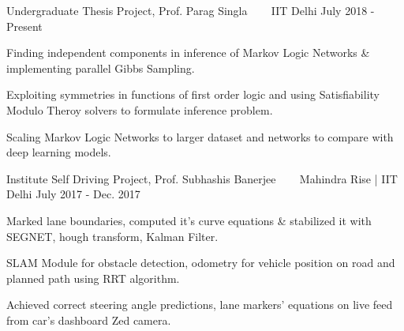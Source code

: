 


\begin{cventries}

  
  \cventry
  {Undergraduate Thesis Project, Prof. Parag Singla}
  {\href{https://github.com/saketdingliwal/MLN-Inference-Task}{}
    \ \ \ \normalfont\href{https://github.com/saketdingliwal/MLN-Inference-Task}
    {}}
  {IIT Delhi}
  {July 2018 - Present}
  {
    \begin{cvitems}
    \item Finding independent components in inference of Markov Logic Networks \& implementing parallel Gibbs Sampling.
    \item Exploiting symmetries in functions of first order logic and using Satisfiability Modulo Theroy solvers to formulate inference problem.
    \item Scaling Markov Logic Networks to larger dataset and networks to compare with deep learning models.
    \end{cvitems}
  }

  \cventry
  {Institute Self Driving Project, Prof. Subhashis Banerjee}
  {\href{https://github.com/AniketBajpai/AutoNav2}{}
    \ \ \ \normalfont\href{https://github.com/AniketBajpai/AutoNav2}
    {}}
  {Mahindra Rise | IIT Delhi}
  {July 2017 - Dec. 2017}
  {
    \begin{cvitems}
    \item Marked lane boundaries, computed it's curve equations \& stabilized it with SEGNET, hough transform, Kalman Filter.
    \item SLAM Module for obstacle detection, odometry for         vehicle position on road and planned path using RRT         algorithm.
    \item Achieved correct steering angle predictions, lane markers' equations on live feed from car's dashboard Zed camera.
    \end{cvitems}
  }


\end{cventries}
